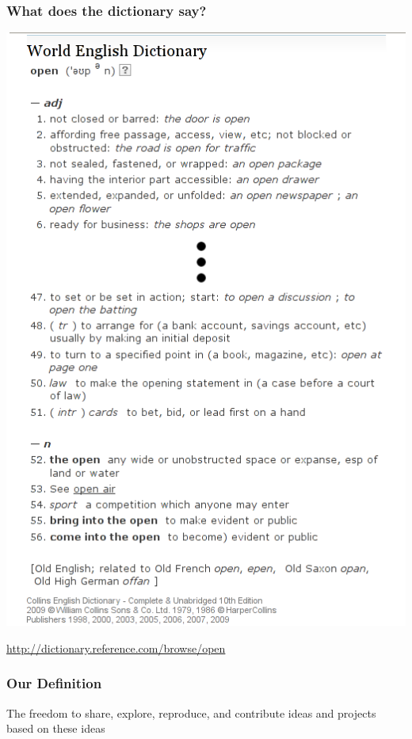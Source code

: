 \documentclass{beamer}
\begin{document}
\begin{frame}
  \frametitle{What does the dictionary say?}
  \begin{center}\includegraphics[height=0.8\textheight]{img/dictionary2}

    \href{http://dictionary.reference.com/browse/open}{http://dictionary.reference.com/browse/open}
  \end{center}
\end{frame}

\begin{frame}
  \frametitle{Our Definition}
  \begin{center}
    \begin{LARGE}
      The freedom to share, explore, reproduce, and contribute ideas
      and projects based on these ideas
    \end{LARGE}
\end{center}
\end{frame}
\end{document}
